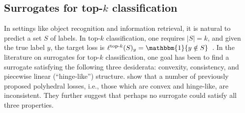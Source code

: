 \documentclass[twoside,11pt]{article}
\newcommand{\Comments}{1}
\newcommand{\mynote}[2]{\ifnum\Comments=1\textcolor{#1}{#2}\fi}
\newcommand{\mytodo}[2]{\ifnum\Comments=1%
  \todo[linecolor=#1!80!black,backgroundcolor=#1,bordercolor=#1!80!black]{#2}\fi}
\newcommand{\raft}[1]{\mytodo{green!20!white}{RF: #1}}
\newcommand{\jessie}[1]{\mynote{teal}{[JF: #1]}}
\newcommand{\jessiet}[1]{\mytodo{teal!20!white}{JF: #1}}
\newcommand{\simplex}{\Delta_\Y}
\newcommand{\Y}{\mathcal{Y}}
\newcommand{\ones}{\mathbbm{1}}
\newcommand{\elltopk}{\ell^{\text{top-$k$}}}
\begin{document}
\subsection{Surrogates for top-$k$ classification}
\label{sec:top-k}
In settings like object recognition and information retrieval, it is natural to predict a set $S$ of labels.
In top-$k$ classification, one requires $|S|=k$, and given the true label $y$, the target loss is $\elltopk(S)_y = \ones\{y\notin S\}$~\citep{lapin2015top, lapin2016loss, lapin2018analysis,yang2018consistency,berrada2018smooth,rastegari2011scalable,reddi2019stochastic}.
In the literature on surrogates for top-$k$ classification, one goal has been to find a surrogate satisfying the following three desiderata: convexity, consistency, and piecewise linear (``hinge-like'') structure.
\citet{yang2018consistency} show that a number of previously proposed polyhedral losses, i.e., those which are convex and hinge-like, are inconsistent.
They further suggest that perhaps no surrogate could satisfy all three properties.
\end{document}
